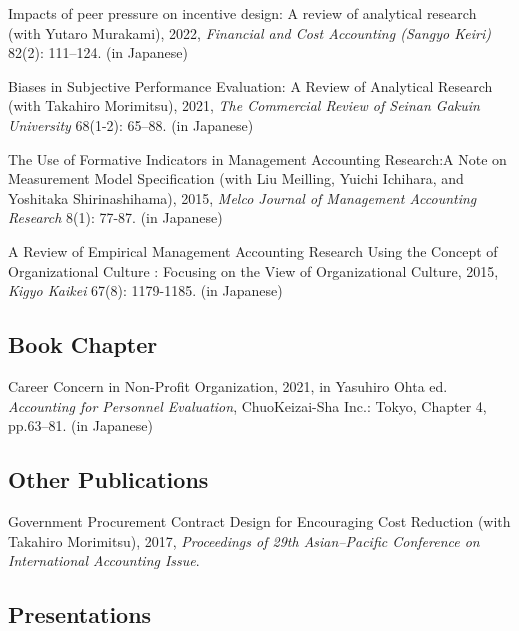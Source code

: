 \documentclass[letterpaper,uplatex]{article}
\renewenvironment{itemize}{
  \begin{list}{}{
    \setlength{\leftmargin}{1.5em}
  }
}{
  \end{list}
}
\begin{document}
\begin{itemize}
    \item Impacts of peer pressure on incentive design: A review of analytical research (with Yutaro Murakami), 2022, \textit{Financial and Cost Accounting (Sangyo Keiri)} 82(2): 111--124. (in Japanese)

    \item Biases in Subjective Performance Evaluation: A Review of Analytical Research (with Takahiro Morimitsu), 2021, \textit{The Commercial Review of Seinan Gakuin University} 68(1-2): 65--88. (in Japanese)
    
	\item The Use of Formative Indicators in Management Accounting Research:A Note on Measurement Model Specification (with Liu Meilling, Yuichi Ichihara, and Yoshitaka Shirinashihama), 2015, \textit{Melco Journal of Management Accounting Research} 8(1): 77-87. (in Japanese)

	\item A Review of Empirical Management Accounting Research Using the Concept of Organizational Culture : Focusing on the View of Organizational Culture, 2015, \textit{Kigyo Kaikei} 67(8): 1179-1185. (in Japanese)
\end{itemize}


\subsection*{Book Chapter}

\begin{itemize}
	\item Career Concern in Non-Profit Organization, 2021, in Yasuhiro Ohta ed. \textit{Accounting for Personnel Evaluation}, ChuoKeizai-Sha Inc.: Tokyo, Chapter 4, pp.63--81. (in Japanese)
\end{itemize}


\subsection*{Other Publications}

\begin{itemize}
	\item Government Procurement Contract Design for Encouraging Cost Reduction (with Takahiro Morimitsu), 2017, \textit{Proceedings of 29th Asian--Pacific Conference on International Accounting Issue}.
\end{itemize}

\subsection*{Presentations}
\end{document}
